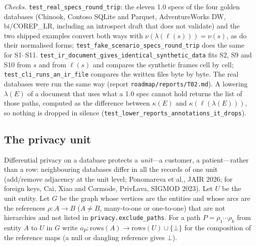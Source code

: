 \noindent\emph{Checks.} \texttt{test\_real\_specs\_round\_trip}: the eleven 1.0 specs of the four golden databases
(Chinook, Contoso SQLite and Parquet, AdventureWorks DW, bi/COREP\_LR, including an introspect draft that does not
validate) and the two shipped examples convert both ways with $\nu(\lambda(\ell(s)))=\nu(s)$, as do their normalised
forms; \texttt{test\_fake\_scenario\_specs\_round\_trip} does the same for S1--S11. \texttt{test\_ir\_document\_gives\_identical\_synthetic\_data}
fits S2, S9 and S10 from $s$ and from $\ell(s)$ and compares the synthetic frames cell by cell;
\texttt{test\_cli\_runs\_an\_ir\_file} compares the written files byte by byte. The real databases were run the same way
(report \texttt{roadmap/reports/T02.md}). A lowering $\lambda(E)$ of a document that uses what a 1.0 spec cannot
hold returns the list of those paths, computed as the difference between $\kappa(E)$ and $\kappa(\ell(\lambda(E)))$, so
nothing is dropped in silence (\texttt{test\_lower\_reports\_annotations\_it\_drops}).

\subsection{The privacy unit}
Differential privacy on a database protects a \emph{unit}---a customer, a patient---rather than a row: neighbouring
databases differ in all the records of one unit (add/remove adjacency at the unit level; Ponomareva et al., JAIR 2026;
for foreign keys, Cai, Xiao and Cormode, PrivLava, SIGMOD 2023). Let $U$ be the unit entity. Let $G$ be the graph
whose vertices are the entities and whose arcs are the references $\rho:A\to B$ ($A\neq B$, many-to-one or
one-to-one) that are not hierarchies and not listed in \texttt{privacy.exclude\_paths}. For a path
$P=\rho_1\cdots\rho_k$ from entity $A$ to $U$ in $G$ write $o_P:\mathrm{rows}(A)\to\mathrm{rows}(U)\cup\{\bot\}$ for the
composition of the reference maps (a null or dangling reference gives $\bot$).

